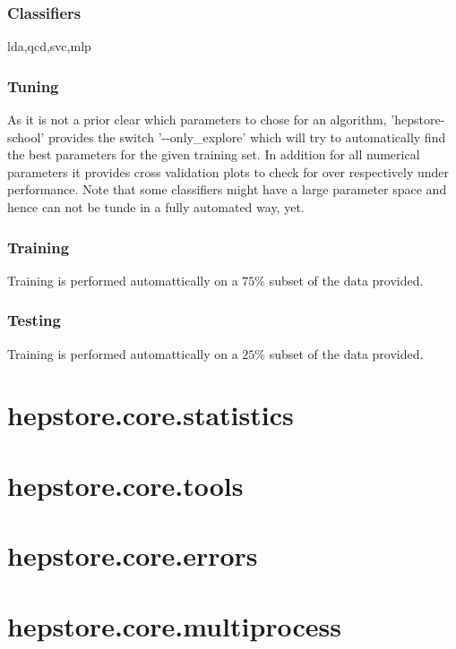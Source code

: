 \subsubsection{Classifiers}

lda,qcd,svc,mlp

\subsubsection{Tuning}

As it is not a prior clear which parameters to chose for an algorithm,
'hepstore-school' provides the switch '-{}-only\_explore' which will
try to automatically find the best parameters for the given training
set. In addition for all numerical parameters it provides cross
validation plots to check for over respectively under
performance. Note that some classifiers might have a large parameter
space and hence can not be tunde in a fully automated way, yet.

\subsubsection{Training}

Training is performed automattically on a $75\%$ subset of the data provided.

\subsubsection{Testing}

Training is performed automattically on a $25\%$ subset of the data provided.

\section{hepstore.core.statistics}

\section{hepstore.core.tools}

\section{hepstore.core.errors}

\section{hepstore.core.multiprocess}
